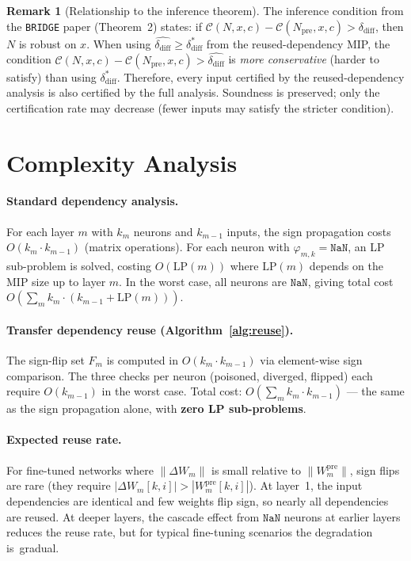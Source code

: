 \documentclass[11pt]{article}
\theoremstyle{definition}
\newtheorem{remark}[theorem]{Remark}
\newcommand{\tool}{\texttt{BRIDGE}\xspace}
\newcommand{\conf}[3]{\mathcal{C}(#1,#2,#3)}
\newcommand{\dD}{\delta_{\mathrm{diff}}}
\newcommand{\Npre}{N_{\mathrm{pre}}}
\begin{document}
\begin{remark}[Relationship to the inference theorem]
  The inference condition from the \tool paper (Theorem~2) states: if $\conf{N}{x}{c} - \conf{\Npre}{x}{c} > \dD$, then $N$ is robust on $x$. When using $\hat{\dD} \ge \dD^*$ from the reused-dependency MIP, the condition $\conf{N}{x}{c} - \conf{\Npre}{x}{c} > \hat{\dD}$ is \emph{more conservative} (harder to satisfy) than using $\dD^*$. Therefore, every input certified by the reused-dependency analysis is also certified by the full analysis. Soundness is preserved; only the certification rate may decrease (fewer inputs may satisfy the stricter condition).
\end{remark}

\section{Complexity Analysis}
\label{sec:complexity}

\paragraph{Standard dependency analysis.}
For each layer $m$ with $k_m$ neurons and $k_{m-1}$ inputs, the sign propagation costs $O(k_m \cdot k_{m-1})$ (matrix operations). For each neuron with $\varphi_{m,k} = \mathtt{NaN}$, an LP sub-problem is solved, costing $O(\mathrm{LP}(m))$ where $\mathrm{LP}(m)$ depends on the MIP size up to layer $m$. In the worst case, all neurons are $\mathtt{NaN}$, giving total cost $O(\sum_m k_m \cdot (k_{m-1} + \mathrm{LP}(m)))$.

\paragraph{Transfer dependency reuse (Algorithm~\ref{alg:reuse}).}
The sign-flip set $F_m$ is computed in $O(k_m \cdot k_{m-1})$ via element-wise sign comparison. The three checks per neuron (poisoned, diverged, flipped) each require $O(k_{m-1})$ in the worst case. Total cost: $O(\sum_m k_m \cdot k_{m-1})$ --- the same as the sign propagation alone, with \textbf{zero LP sub-problems}.

\paragraph{Expected reuse rate.}
For fine-tuned networks where $\|\Delta W_m\|$ is small relative to $\|W_m^{\mathrm{pre}}\|$, sign flips are rare (they require $|\Delta W_m[k,i]| > |W_m^{\mathrm{pre}}[k,i]|$). At layer~1, the input dependencies are identical and few weights flip sign, so nearly all dependencies are reused. At deeper layers, the cascade effect from $\mathtt{NaN}$ neurons at earlier layers reduces the reuse rate, but for typical fine-tuning scenarios the degradation is~gradual.
\end{document}
